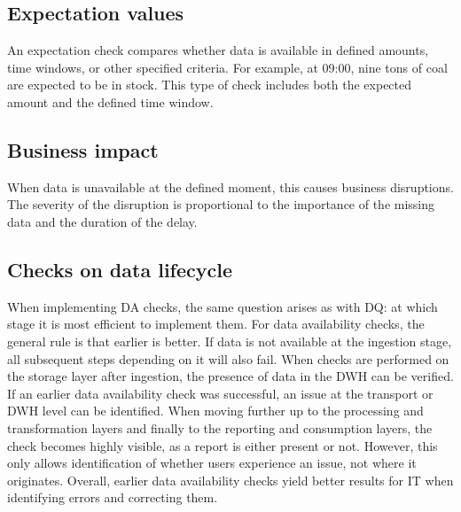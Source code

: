 \subsection*{Expectation values}
An expectation check compares whether data is available in defined amounts, time windows, or other specified criteria. For example, at 09:00, nine tons of coal are expected to be in stock. This type of check includes both the expected amount and the defined time window.

\subsection*{Business impact}
When data is unavailable at the defined moment, this causes business disruptions. The severity of the disruption is proportional to the importance of the missing data and the duration of the delay.

\subsection*{Checks on data lifecycle}
When implementing \gls{DA} checks, the same question arises as with \gls{DQ}: at which stage it is most efficient to implement them. For data availability checks, the general rule is that earlier is better. If data is not available at the ingestion stage, all subsequent steps depending on it will also fail. When checks are performed on the storage layer after ingestion, the presence of data in the DWH can be verified. If an earlier data availability check was successful, an issue at the transport or DWH level can be identified. When moving further up to the processing and transformation layers and finally to the reporting and consumption layers, the check becomes highly visible, as a report is either present or not. However, this only allows identification of whether users experience an issue, not where it originates. Overall, earlier data availability checks yield better results for IT when identifying errors and correcting them.